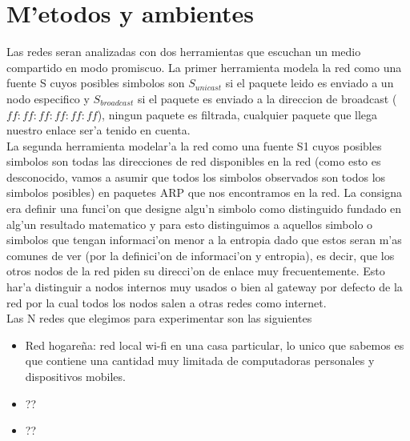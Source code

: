 \section{M'etodos y ambientes}
Las redes seran analizadas con dos herramientas que escuchan un medio compartido en modo promiscuo. La primer herramienta
 modela la red como una fuente S cuyos posibles simbolos son $S_{unicast}$ si el paquete leido es enviado
 a un nodo especifico y $S_{broadcast}$ si el paquete es enviado a la direccion de broadcast ($ff:ff:ff:ff:ff:ff$), ningun paquete
 es filtrada, cualquier paquete que llega nuestro enlace ser'a tenido en cuenta.\\
La segunda herramienta modelar'a la red como una fuente S1 cuyos posibles simbolos son todas las direcciones de red disponibles
en la red (como esto es desconocido, vamos a asumir que todos los simbolos observados son todos los simbolos posibles) en 
paquetes ARP que nos encontramos en la red. La consigna era definir una funci'on que designe algu'n simbolo como distinguido
fundado en alg'un resultado matematico y para esto distinguimos a aquellos simbolo o simbolos que tengan informaci'on menor a
la entropia dado que estos seran m'as comunes de ver (por la definici'on de informaci'on y entropia), es decir, que los otros
nodos de la red piden su direcci'on de enlace muy frecuentemente. Esto har'a distinguir a nodos internos muy usados o bien
al gateway por defecto de la red por la cual todos los nodos salen a otras redes como internet.\\

Las N redes que elegimos para experimentar son las siguientes
\begin{itemize}
	\item Red hogare\~na: red local wi-fi en una casa particular, lo unico que sabemos es que contiene una cantidad muy
	 limitada de computadoras personales y dispositivos mobiles.
	\item ??
	\item ??
\end{itemize}
